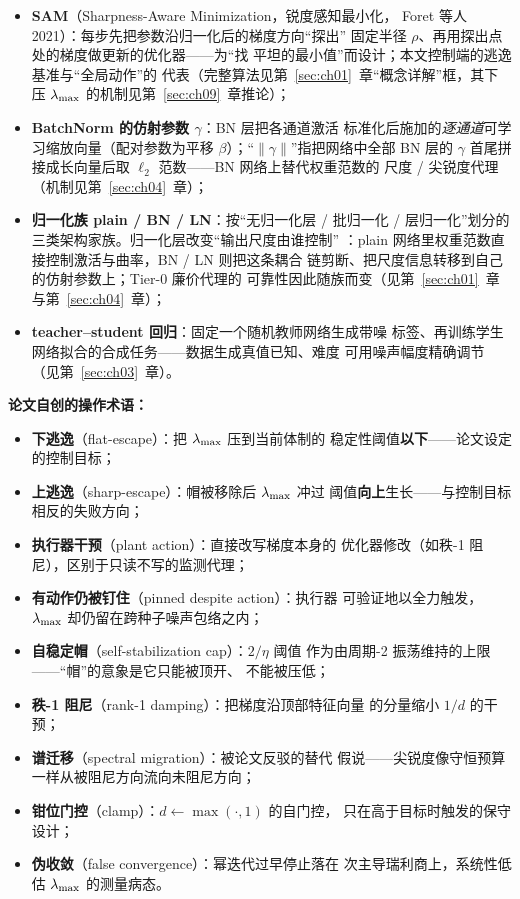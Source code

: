\begin{itemize}
  \item \textbf{SAM}（Sharpness-Aware Minimization，锐度感知最小化，
        Foret 等人 2021）：每步先把参数沿归一化后的梯度方向``探出''
        固定半径 $\rho$、再用探出点处的梯度做更新的优化器——为``找
        平坦的最小值''而设计；本文控制端的逃逸基准与``全局动作''的
        代表（完整算法见第~\ref{sec:ch01}~章``概念详解''框，其下压
        $\lambda_{\max}$ 的机制见第~\ref{sec:ch09}~章推论）；
  \item \textbf{BatchNorm 的仿射参数 $\gamma$}：BN 层把各通道激活
        标准化后施加的\emph{逐通道}可学习缩放向量（配对参数为平移
        $\beta$）；``$\|\gamma\|$''指把网络中全部 BN 层的 $\gamma$
        首尾拼接成长向量后取 $\ell_2$ 范数——BN 网络上替代权重范数的
        尺度 / 尖锐度代理（机制见第~\ref{sec:ch04}~章）；
  \item \textbf{归一化族 plain / BN / LN}：按``无归一化层 / 批归一化 /
        层归一化''划分的三类架构家族。归一化层改变``输出尺度由谁控制''
        ：plain 网络里权重范数直接控制激活与曲率，BN / LN 则把这条耦合
        链剪断、把尺度信息转移到自己的仿射参数上；Tier-0 廉价代理的
        可靠性因此随族而变（见第~\ref{sec:ch01}~章与第~\ref{sec:ch04}~章）；
  \item \textbf{teacher--student 回归}：固定一个随机教师网络生成带噪
        标签、再训练学生网络拟合的合成任务——数据生成真值已知、难度
        可用噪声幅度精确调节（见第~\ref{sec:ch03}~章）。
\end{itemize}

\textbf{论文自创的操作术语：}

\begin{itemize}
  \item \textbf{下逃逸}（flat-escape）：把 $\lambda_{\max}$ 压到当前体制的
        稳定性阈值\textbf{以下}——论文设定的控制目标；
  \item \textbf{上逃逸}（sharp-escape）：帽被移除后 $\lambda_{\max}$ 冲过
        阈值\textbf{向上}生长——与控制目标相反的失败方向；
  \item \textbf{执行器干预}（plant action）：直接改写梯度本身的
        优化器修改（如秩-1 阻尼），区别于只读不写的监测代理；
  \item \textbf{有动作仍被钉住}（pinned despite action）：执行器
        可验证地以全力触发，$\lambda_{\max}$ 却仍留在跨种子噪声包络之内；
  \item \textbf{自稳定帽}（self-stabilization cap）：$2/\eta$ 阈值
        作为由周期-2 振荡维持的上限——``帽''的意象是它只能被顶开、
        不能被压低；
  \item \textbf{秩-1 阻尼}（rank-1 damping）：把梯度沿顶部特征向量
        的分量缩小 $1/d$ 的干预；
  \item \textbf{谱迁移}（spectral migration）：被论文反驳的替代
        假说——尖锐度像守恒预算一样从被阻尼方向流向未阻尼方向；
  \item \textbf{钳位门控}（clamp）：$d\gets\max(\cdot,1)$ 的自门控，
        只在高于目标时触发的保守设计；
  \item \textbf{伪收敛}（false convergence）：幂迭代过早停止落在
        次主导瑞利商上，系统性低估 $\lambda_{\max}$ 的测量病态。
\end{itemize}

